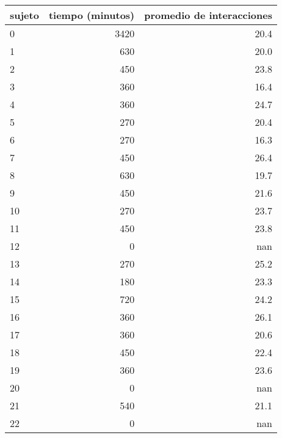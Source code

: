\documentclass[spanish]{article}
\begin{document}
\begin{table}[h!]
\begin{center}
\begin{tabular}{|l|r|r|}
\hline
sujeto & tiempo (minutos) & promedio de interacciones\\ \hline
     0 &             3420 &                      20.4\\ \hline
     1 &              630 &                      20.0\\ \hline
     2 &              450 &                      23.8\\ \hline
     3 &              360 &                      16.4\\ \hline
     4 &              360 &                      24.7\\ \hline
     5 &              270 &                      20.4\\ \hline
     6 &              270 &                      16.3\\ \hline
     7 &              450 &                      26.4\\ \hline
     8 &              630 &                      19.7\\ \hline
     9 &              450 &                      21.6\\ \hline
    10 &              270 &                      23.7\\ \hline
    11 &              450 &                      23.8\\ \hline
    12 &                0 &                       nan\\ \hline
    13 &              270 &                      25.2\\ \hline
    14 &              180 &                      23.3\\ \hline
    15 &              720 &                      24.2\\ \hline
    16 &              360 &                      26.1\\ \hline
    17 &              360 &                      20.6\\ \hline
    18 &              450 &                      22.4\\ \hline
    19 &              360 &                      23.6\\ \hline
    20 &                0 &                       nan\\ \hline
    21 &              540 &                      21.1\\ \hline
    22 &                0 &                       nan\\ \hline

\end{tabular}
\end{center}
\end{table}
\end{document}
